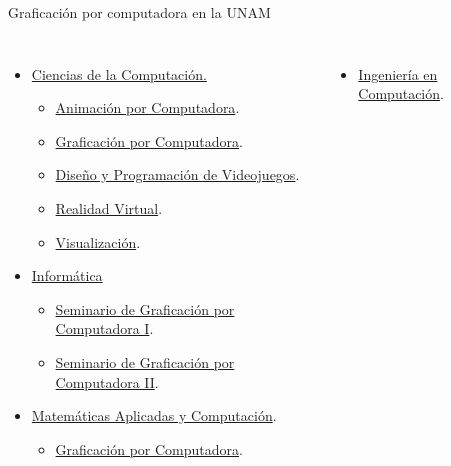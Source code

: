 \begin{frame}{Graficación por computadora en la UNAM}
\begin{columns}
\begin{itemize}
    \item \href{https://www.fciencias.unam.mx/estudiar-en-ciencias/estudios/licenciaturas/ccomputacion}{Ciencias de la Computación.}
    \begin{itemize}
        \item \href{https://www.fciencias.unam.mx/estudiar-en-ciencias/estudios/licenciaturas/asignaturas/1556/659}{Animación por Computadora}.
        \item \href{https://www.fciencias.unam.mx/estudiar-en-ciencias/estudios/licenciaturas/asignaturas/1556/803}{Graficación por Computadora}.
        \item \href{https://www.fciencias.unam.mx/estudiar-en-ciencias/estudios/licenciaturas/asignaturas/1556/666}{Diseño y Programación de Videojuegos}.
        \item \href{https://www.fciencias.unam.mx/estudiar-en-ciencias/estudios/licenciaturas/asignaturas/1556/771}{Realidad Virtual}.
        \item \href{https://www.fciencias.unam.mx/estudiar-en-ciencias/estudios/licenciaturas/asignaturas/1556/809}{Visualización}.
    \end{itemize}
    \item \href{https://www.cuautitlan.unam.mx/licenciaturas/informatica/}{Informática}
    \begin{itemize}
        \item \href{https://www.cuautitlan.unam.mx/licenciaturas/informatica/}{Seminario de Graficación por Computadora I}.
        \item \href{https://www.cuautitlan.unam.mx/licenciaturas/informatica/descargas/optativas_eleccion/sgcll.pdf}{Seminario de Graficación por Computadora II}.
    \end{itemize}
    \item \href{https://mac.acatlan.unam.mx/}{Matemáticas Aplicadas y Computación}.
    \begin{itemize}
        \item \href{https://mac.acatlan.unam.mx/media/temarios/1644/1055.pdf}{Graficación por Computadora}.
    \end{itemize}
\end{itemize}
\begin{itemize}
    \item \href{https://www.ingenieria.unam.mx/programas_academicos/licenciatura/computacion.php}{Ingeniería en Computación}.

\end{itemize}
\end{columns}
\end{frame}
